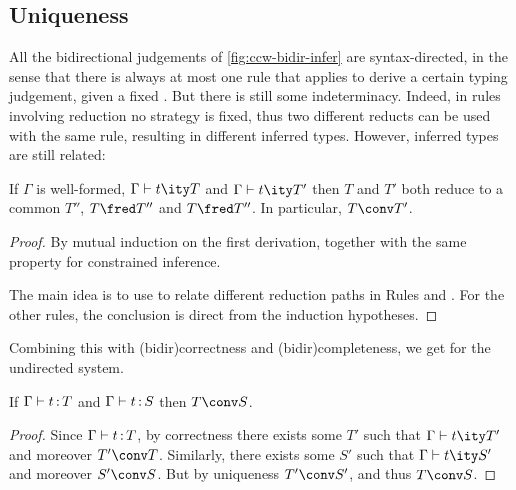 \subsection{Uniqueness}

All the bidirectional judgements of \cref{fig:ccw-bidir-infer} are syntax-directed,
in the sense that there is always at most one rule that applies to derive a certain typing judgement, given a fixed .
But there is still some indeterminacy.
Indeed, in rules involving reduction no strategy is fixed, thus two different reducts can be used with the same rule, resulting in different inferred types.
However, inferred types are still related:

\begin{theorem}
  \label{thm:unique-inf}
  If $\Gamma$ is well-formed,
  $\inferty{\Gamma}{t}{T}$ and $\inferty{\Gamma}{t}{T'}$ then $T$ and $T'$ both reduce to a
  common $T''$, \eg $T \red T''$ and $T \red T''$.
  In particular, $T \conv T'$.
\end{theorem}

\begin{proof}
  By mutual induction on the first derivation, together with the same property for
  constrained inference.

  The main idea is to use  to relate different reduction paths in Rules
   and . For the other rules,
  the conclusion is direct from the induction hypotheses.
\end{proof}

Combining this with \kl(bidir){correctness} and \kl(bidir){completeness},
we get  for the undirected system.

\begin{theorem}
  \label{thm:unique-undir}
  If $\Gamma \vdash t \operatorname{\mathrel{:}} T$ and $\Gamma \vdash t \operatorname{\mathrel{:}} S$ then $T \conv S$.
\end{theorem}

\begin{minipage}{\textwidth}
\begin{proof}
  Since $\Gamma \vdash t \operatorname{\mathrel{:}} T$, by correctness
  there exists some $T'$ such that $\inferty{\Gamma}{t}{T'}$ and moreover $T' \conv T$.
  Similarly, there exists some $S'$ such that $\inferty{\Gamma}{t}{S'}$
  and moreover $S' \conv S$.
  But by uniqueness $T' \conv S'$, and thus $T \conv S$.
\end{proof}  
\end{minipage}



